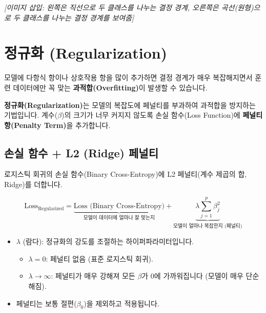 \documentclass[11pt,a4paper]{book}
\theoremstyle{definition}
\begin{document}

\textit{[이미지 삽입: 왼쪽은 직선으로 두 클래스를 나누는 결정 경계, 오른쪽은 곡선(원형)으로 두 클래스를 나누는 결정 경계를 보여줌]}


\section{정규화 (Regularization)}

모델에 다항식 항이나 상호작용 항을 많이 추가하면 결정 경계가 매우 복잡해지면서 훈련 데이터에만 꼭 맞는 \textbf{과적합(Overfitting)}이 발생할 수 있습니다.

\textbf{정규화(Regularization)}는 모델의 복잡도에 페널티를 부과하여 과적합을 방지하는 기법입니다.
계수($\beta$)의 크기가 너무 커지지 않도록 손실 함수(Loss Function)에 \textbf{페널티 항(Penalty Term)}을 추가합니다.

\subsection{손실 함수 + L2 (Ridge) 페널티}

로지스틱 회귀의 손실 함수(Binary Cross-Entropy)에 L2 페널티(계수 제곱의 합, Ridge)를 더합니다.

$$ \text{Loss}_{\text{Regularized}} = \underbrace{\text{Loss (Binary Cross-Entropy)}}_{\text{모델이 데이터에 얼마나 잘 맞는지}} + \underbrace{\lambda \sum_{j=1}^{p} \beta_j^2}_{\text{모델이 얼마나 복잡한지 (페널티)}} $$

\begin{itemize}
  \item $\lambda$ (람다): 정규화의 강도를 조절하는 하이퍼파라미터입니다.
    \begin{itemize}
      \item $\lambda=0$: 페널티 없음 (표준 로지스틱 회귀).
      \item $\lambda \to \infty$: 페널티가 매우 강해져 모든 $\beta$가 0에 가까워집니다 (모델이 매우 단순해짐).
    \end{itemize}
  \item 페널티는 보통 절편($\beta_0$)을 제외하고 적용됩니다.
\end{itemize}
\end{document}
